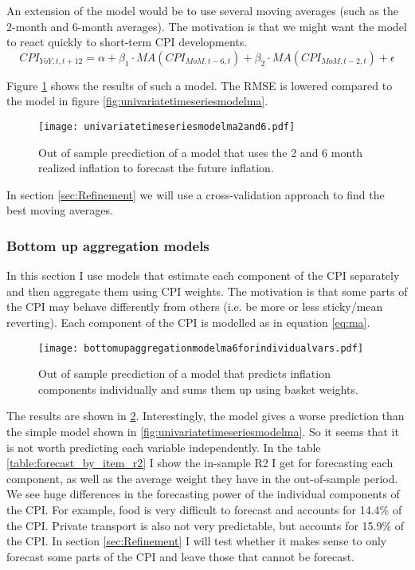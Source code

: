 \documentclass[12pt]{article}
\begin{document}
An extension of the model would be to use several moving averages (such as the 2-month and 6-month averages). The motivation is that we might want the model to react quickly to short-term CPI developments.
\begin{equation}
CPI_{YoY, t, t+12} = \alpha + \beta_1 \cdot MA(CPI_{MoM,t-6,t})+ \beta_2 \cdot MA(CPI_{MoM,t-2,t})+\epsilon
\end{equation}

Figure \ref{fig:univariatetimeseriesmodelma2and6} shows the results of such a model. The RMSE is lowered compared to the model in figure \ref{fig:univariatetimeseriesmodelma}. 

\begin{figure}[h]
    \centering
    \texttt{[image: univariatetimeseriesmodelma2and6.pdf]}
    \caption{Out of sample precdiction of a model that uses the 2 and 6 month realized inflation to forecast the future inflation.}
    \label{fig:univariatetimeseriesmodelma2and6}
\end{figure}
In section \ref{sec:Refinement} we will use a cross-validation approach to find the best moving averages.

\subsubsection{Bottom up aggregation models}
\label{sec:agg}
In this section I use models that estimate each component of the CPI separately and then aggregate them using CPI weights. The motivation is that some parts of the CPI may behave differently from others (i.e. be more or less sticky/mean reverting). 
Each component of the CPI is modelled as in equation \ref{eq:ma}.


\begin{figure}[h]
    \centering
    \texttt{[image: bottomupaggregationmodelma6forindividualvars.pdf]}
    \caption{Out of sample precdiction of a model that predicts inflation components individually and sums them up using basket weights.}
    \label{fig:bottomupaggregationmodelma6forindividualvars}
\end{figure}

The results are shown in \ref{fig:bottomupaggregationmodelma6forindividualvars}. Interestingly, the model gives a worse prediction than the simple model shown in \ref{fig:univariatetimeseriesmodelma}. So it seems that it is not worth predicting each variable independently.  In the table \ref{table:forecast_by_item_r2} I show the in-sample R2 I get for forecasting each component, as well as the average weight they have in the out-of-sample period.
We see huge differences in the forecasting power of the individual components of the CPI. For example, food is very difficult to forecast and accounts for 14.4\% of the CPI. Private transport is also not very predictable, but accounts for 15.9\% of the CPI. 
In section \ref{sec:Refinement} I will test whether it makes sense to only forecast some parts of the CPI and leave those that cannot be forecast. 
\end{document}
